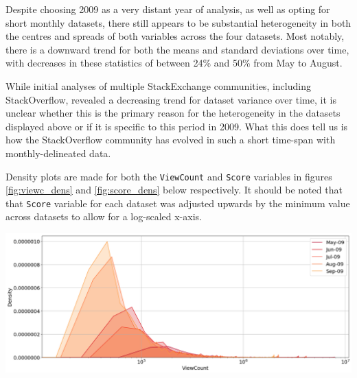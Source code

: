 \documentclass[11pt,preprint, authoryear]{article}
\let\origfigure\figure
\let\endorigfigure\endfigure
\renewenvironment{figure}[1][2] {
    \expandafter\origfigure\expandafter[H]
} {
    \endorigfigure
}
\numberwithin{equation}{section}
\begin{document}
\normalsize

Despite choosing 2009 as a very distant year of analysis, as well as
opting for short monthly datasets, there still appears to be substantial
heterogeneity in both the centres and spreads of both variables across
the four datasets. Most notably, there is a downward trend for both the
means and standard deviations over time, with decreases in these
statistics of between 24\% and 50\% from May to August.

While initial analyses of multiple StackExchange communities, including
StackOverflow, revealed a decreasing trend for dataset variance over
time, it is unclear whether this is the primary reason for the
heterogeneity in the datasets displayed above or if it is specific to
this period in 2009. What this does tell us is how the StackOverflow
community has evolved in such a short time-span with monthly-delineated
data.

Density plots are made for both the \texttt{ViewCount} and
\texttt{Score} variables in figures \ref{fig:viewc_dens} and
\ref{fig:score_dens} below respectively. It should be noted that that
\texttt{Score} variable for each dataset was adjusted upwards by the
minimum value across datasets to allow for a log-scaled x-axis.

\footnotesize

\begin{figure}
\caption{\textbf{ViewCount Density Plot}}
\label{fig:viewc_dens}

\begin{center}\includegraphics[width=1\linewidth]{../../01-python-code/00-workspace/01-eda/01-graphs/viewcount-sgl-density-plot} \end{center}
\end{figure}

\normalsize

\footnotesize
\end{document}

